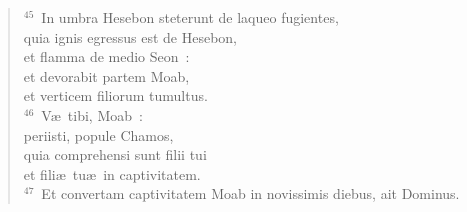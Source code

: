 \begin{flushleft}
\begin{verse}
${}^{45}$~In umbra Hesebon steterunt de laqueo fugientes,\\ quia ignis egressus est de Hesebon,\\ et flamma de medio Seon~:\\ et devorabit partem Moab,\\ et verticem filiorum tumultus.\\
${}^{46}$~V\ae\ tibi, Moab~:\\ periisti, popule Chamos,\\ quia comprehensi sunt filii tui\\ et fili\ae\ tu\ae\ in captivitatem.\\
${}^{47}$~Et convertam captivitatem Moab in novissimis diebus, ait Dominus.\end{verse}\end{flushleft}

